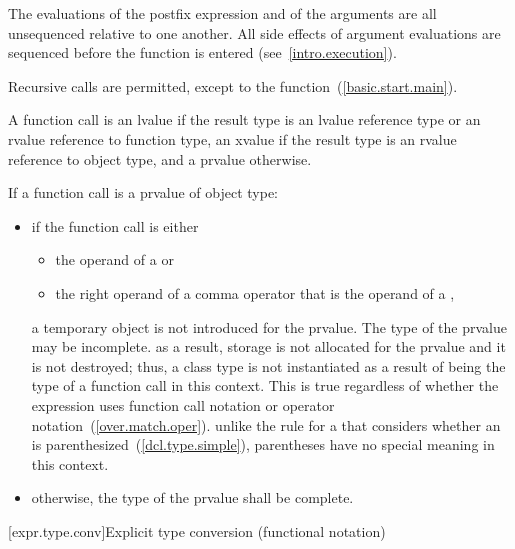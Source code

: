 \pnum
{}%
%
\enternote
The evaluations of the postfix expression and of the arguments
are all unsequenced relative to one another.
%
All side effects of
argument evaluations are sequenced before the function is
entered (see~\ref{intro.execution}).
\exitnote

\pnum
{}%
Recursive calls are permitted, except to the 
function~(\ref{basic.start.main}).

\pnum
A function call is an lvalue
if the result type is an lvalue reference type or an rvalue reference to function type,
an xvalue if the result type is an rvalue reference to object type, and a prvalue
otherwise.

\pnum
If a function call is a prvalue of object type:

\begin{itemize}
\item if the function call is either
\begin{itemize}
\item the operand of a  or
\item the right operand of a comma operator that is the operand of a
,
\end{itemize}
a temporary object is not introduced for the prvalue. The type of the prvalue
may be incomplete. \enternote as a result, storage is not allocated for the
prvalue and it is not destroyed; thus, a class type is not instantiated as a
result of being the type of a function call in this context. This is true
regardless of whether the expression uses function call notation or operator
notation~(\ref{over.match.oper}). \exitnote \enternote unlike the rule for
a  that considers whether an 
is parenthesized~(\ref{dcl.type.simple}), parentheses have no special meaning
in this context. \exitnote

\item otherwise, the type of the prvalue shall be complete.
\end{itemize}

[expr.type.conv]{Explicit type conversion (functional notation)}


